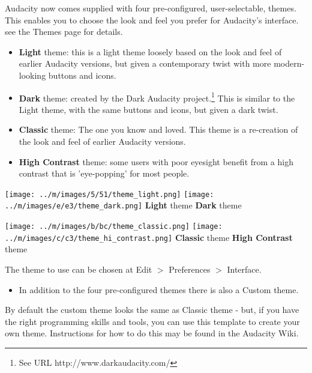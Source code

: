 \documentclass[twocolumn]{book}
\begin{document}
Audacity now comes supplied with four pre-configured, user-selectable, themes.  This enables you to choose the look and feel you prefer for Audacity's interface. see the Themes page for details.
\begin{itemize}
\item \textbf{Light} theme: this is a light theme loosely based on the look and feel of earlier Audacity versions, but given a contemporary twist with more modern-looking buttons and icons. 
\item \textbf{Dark} theme: created by the Dark Audacity project.\footnote{See URL http://www.darkaudacity.com/} This is similar to the Light theme, with the same buttons and icons, but given a dark twist.
\item \textbf{Classic} theme: The one you know and loved. This theme is a re-creation of the look and feel of earlier Audacity versions. 
\item \textbf{High Contrast} theme: some users with poor eyesight benefit from a high contrast that is 'eye-popping' for most people.
\end{itemize}



\* \* \* \* \texttt{[image: ../m/images/5/51/theme\_light.png]}
\* \* \* \* \texttt{[image: ../m/images/e/e3/theme\_dark.png]}
\* \* \* \* 
\textbf{Light} theme
\* \* \* \* 
\textbf{Dark} theme


\* \* \* \* \texttt{[image: ../m/images/b/bc/theme\_classic.png]}
\* \* \* \* \texttt{[image: ../m/images/c/c3/theme\_hi\_contrast.png]}
\* \* \* \* 
\textbf{Classic} theme
\* \* \* \* 
\textbf{High Contrast} theme



The theme to use can be chosen at Edit \mbox{$>$} Preferences \mbox{$>$} Interface.  
\begin{itemize}
\item  In addition to the four pre-configured themes there is also a Custom theme.  
\end{itemize}
 By default the custom theme looks the same as Classic theme - but, if you have the right programming skills and tools, you can use this template to create your own theme.  Instructions for how to do this may be found in the Audacity Wiki.
\end{document}
